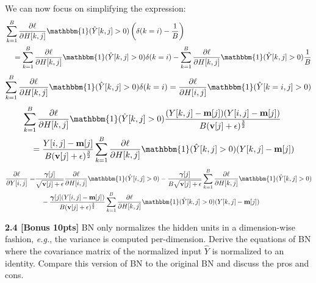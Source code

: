 \documentclass{article}
\begin{document}
{We can now focus on simplifying the expression:
\begin{equation}
\begin{aligned}
    &\sum_{k=1}^{B} \frac{\partial \ell}{\partial H[k,j]} \mathbbm{1}(\hat{Y}[k,j]>0) \left(\delta(k=i)- \frac{1}{B} \right)\\
    &\quad = \sum_{k=1}^{B} \frac{\partial \ell}{\partial H[k,j]} \mathbbm{1}(\hat{Y}[k,j]>0) \delta(k=i)- \sum_{k=1}^{B} \frac{\partial \ell}{\partial H[k,j]} \mathbbm{1}(\hat{Y}[k,j]>0) \frac{1}{B}
\end{aligned}
\end{equation}
\begin{equation}
    \sum_{k=1}^{B} \frac{\partial \ell}{\partial H[k,j]} \mathbbm{1}(\hat{Y}[k,j]>0) \delta(k=i)= \frac{\partial \ell}{\partial H[i,j]} \mathbbm{1}(\hat{Y}[k=i,j]>0)
\end{equation}
\begin{equation}
\begin{aligned}
    &\sum_{k=1}^{B} \frac{\partial \ell}{\partial H[k,j]} \mathbbm{1}(\hat{Y}[k,j]>0) \frac{(Y[k,j]- \textbf{m}[j])(Y[i,j]- \textbf{m}[j])}{B(\textbf{v}[j]+ \epsilon)^{\frac{3}{2}}}\\
    &\quad = \frac{Y[i,j]- \textbf{m}[j]}{B(\textbf{v}[j]+ \epsilon)^{\frac{3}{2}}} \sum_{k=1}^{B} \frac{\partial \ell}{\partial H[k,j]} \mathbbm{1}(\hat{Y}[k,j]>0) (Y[k,j]- \textbf{m}[j]) 
\end{aligned}
\end{equation}
\begin{equation}
\begin{aligned}
    \frac{\partial \ell}{\partial Y[i,j]}= &\frac{\boldsymbol{\gamma}[j]}{\sqrt{\textbf{v}[j]+ \epsilon}} \frac{\partial \ell}{\partial H[i,j]} \mathbbm{1}(\hat{Y}[i,j]>0)- \frac{\boldsymbol{\gamma}[j]}{B \sqrt{\textbf{v}[j]+ \epsilon}} \sum_{k=1}^{B} \frac{\partial \ell}{\partial H[k,j]} \mathbbm{1}(\hat{Y}[k,j]>0)\\
    &\quad - \frac{\boldsymbol{\gamma}[j] (Y[i,j]- \textbf{m}[j])}{B(\textbf{v}[j]+ \epsilon)^{\frac{3}{2}}} \sum_{k=1}^{B} \frac{\partial \ell}{\partial H[k,j]} \mathbbm{1}(\hat{Y}[k,j]>0) (Y[k,j]- \textbf{m}[j])
\end{aligned}
\end{equation}
}

\noindent
\textbf{2.4 [Bonus 10pts]} BN only normalizes the hidden units in a dimension-wise fashion, \textit{e.g.}, the variance is computed per-dimension. Derive the equations of BN where the covariance matrix of the normalized input $\hat{Y}$ is normalized to an identity. Compare this version of BN to the original BN and discuss the pros and cons.\\
\end{document}

